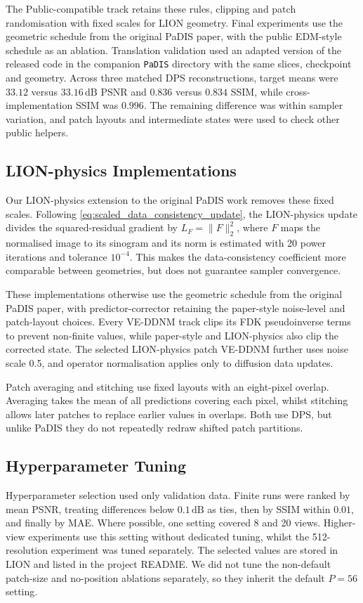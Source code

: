 The Public-compatible track retains these rules, clipping and patch randomisation with fixed scales for LION geometry. Final experiments use the geometric schedule from the original PaDIS paper, with the public EDM-style schedule as an ablation. Translation validation used an adapted version of the released code in the companion \texttt{PaDIS} directory with the same slices, checkpoint and geometry. Across three matched DPS reconstructions, target means were $33.12$ versus $33.16\,\mathrm{dB}$ PSNR and $0.836$ versus $0.834$ SSIM, while cross-implementation SSIM was $0.996$. The remaining difference was within sampler variation, and patch layouts and intermediate states were used to check other public helpers.

\subsection{LION-physics Implementations}
\label{subsec:lion-physics-implementations}
Our LION-physics extension to the original PaDIS work removes these fixed scales. Following \autoref{eq:scaled_data_consistency_update}, the LION-physics update divides the squared-residual gradient by $L_F=\lVert F\rVert_2^2$, where $F$ maps the normalised image to its sinogram and its norm is estimated with 20 power iterations and tolerance $10^{-4}$. This makes the data-consistency coefficient more comparable between geometries, but does not guarantee sampler convergence.

These implementations otherwise use the geometric schedule from the original PaDIS paper, with predictor-corrector retaining the paper-style noise-level and patch-layout choices. Every VE-DDNM track clips its FDK pseudoinverse terms to prevent non-finite values, while paper-style and LION-physics also clip the corrected state. The selected LION-physics patch VE-DDNM further uses noise scale 0.5, and operator normalisation applies only to diffusion data updates.

Patch averaging and stitching use fixed layouts with an eight-pixel overlap. Averaging takes the mean of all predictions covering each pixel, whilst stitching allows later patches to replace earlier values in overlaps. Both use DPS, but unlike PaDIS they do not repeatedly redraw shifted patch partitions.

\subsection{Hyperparameter Tuning}
Hyperparameter selection used only validation data. Finite runs were ranked by mean PSNR, treating differences below $0.1\,\mathrm{dB}$ as ties, then by SSIM within $0.01$, and finally by MAE. Where possible, one setting covered 8 and 20 views. Higher-view experiments use this setting without dedicated tuning, whilst the 512-resolution experiment was tuned separately. The selected values are stored in LION and listed in the project README. We did not tune the non-default patch-size and no-position ablations separately, so they inherit the default $P=56$ setting.

